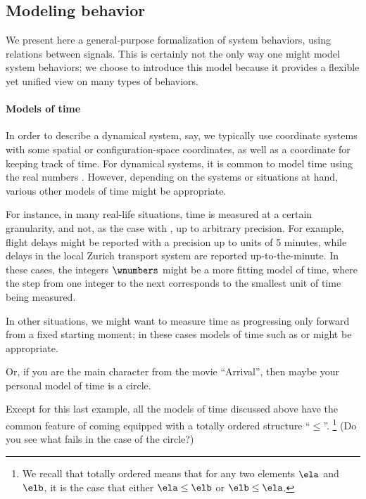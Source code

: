 \subsection{Modeling behavior}

We present here a general-purpose formalization of system behaviors, using relations between signals.
This is certainly not the only way one might model system behaviors; we choose to introduce this model because it provides a flexible yet unified view on many types of behaviors.

\paragraph{Models of time}

In order to describe a dynamical system, say, we typically use coordinate systems with some spatial or configuration-space coordinates, as well as a coordinate for keeping track of time.
For dynamical systems, it is common to model time using the real numbers \reals.
However, depending on the systems or situations at hand, various other models of time might be appropriate.

For instance, in many real-life situations, time is measured at a certain granularity, and not, as the case with \reals, up to arbitrary precision.
For example, flight delays might be reported with a precision up to units of 5 minutes, while delays in the local Zurich transport system are reported up-to-the-minute.
In these cases, the integers $\wnumbers$ might be a more fitting model of time, where the step from one integer to the next corresponds to the smallest unit of time being measured.

In other situations, we might want to measure time as progressing only forward from a fixed starting moment; in these cases models of time such as \nonNegReals or \natnumbers might be appropriate.

Or, if you are the main character from the movie ``Arrival'', then maybe your personal model of time is a circle.


Except for this last example, all the models of time discussed above have the common feature of coming equipped with a totally ordered  structure ``$\leq$''.
\footnote{We recall that totally ordered means that for any two elements $\ela$ and $\elb$, it is the case that either $\ela \leq \elb$ or $\elb \leq \ela$.}  (Do you see what fails in the case of the circle?)


